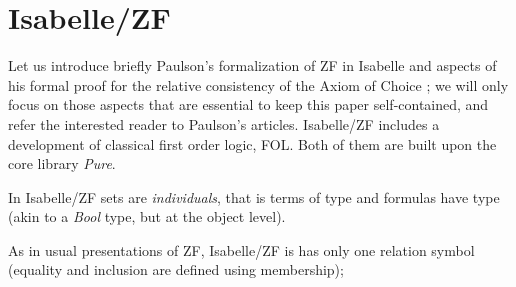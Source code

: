 \section{Isabelle/ZF}

Let us introduce briefly Paulson's formalization of ZF
\cite{paulson2017isabelle} in Isabelle and aspects of his formal proof
for the relative consistency of the Axiom of Choice
\cite{paulson_2003}; we will only focus on those aspects that are
essential to keep this paper self-contained, and refer the interested
reader to Paulson's articles. 
Isabelle/ZF includes a development of classical first order logic,
FOL. Both of them are  built upon the core library \emph{Pure}. 

In Isabelle/ZF sets are \emph{individuals}, that is terms of type
 and formulas have type  
(akin to a \emph{Bool} type, but at the object level). 


As in usual presentations
of ZF, Isabelle/ZF is has only one relation symbol
\isatt{\ensuremath{\in}} (equality and inclusion are defined
using membership); 


